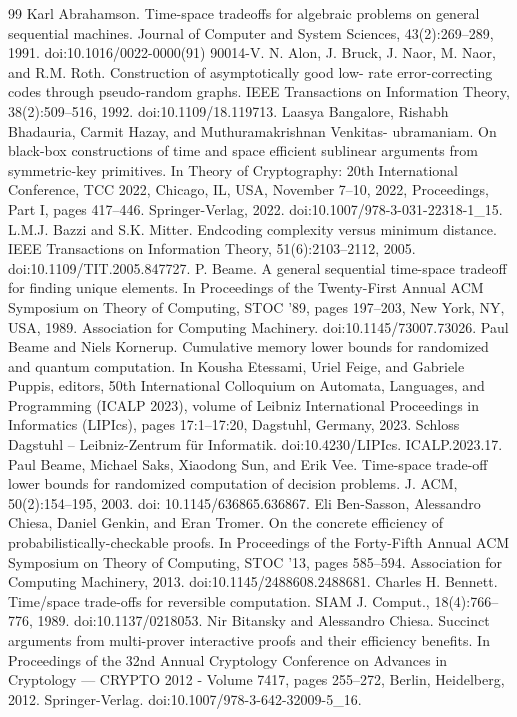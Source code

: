 \documentclass[10pt,a4paper]{article}
\begin{document}
\begin{thebibliography}{99}
 Karl Abrahamson. Time-space tradeoffs for algebraic problems on general sequential machines. Journal of Computer and System Sciences, 43(2):269–289, 1991. doi:10.1016/0022-0000(91) 90014-V.
 N. Alon, J. Bruck, J. Naor, M. Naor, and R.M. Roth. Construction of asymptotically good low- rate error-correcting codes through pseudo-random graphs. IEEE Transactions on Information Theory, 38(2):509–516, 1992. doi:10.1109/18.119713.
 Laasya Bangalore, Rishabh Bhadauria, Carmit Hazay, and Muthuramakrishnan Venkitas- ubramaniam. On black-box constructions of time and space efficient sublinear arguments from symmetric-key primitives. In Theory of Cryptography: 20th International Conference, TCC 2022, Chicago, IL, USA, November 7–10, 2022, Proceedings, Part I, pages 417–446. Springer-Verlag, 2022. doi:10.1007/978-3-031-22318-1\_15.
 L.M.J. Bazzi and S.K. Mitter. Endcoding complexity versus minimum distance. IEEE Transactions on Information Theory, 51(6):2103–2112, 2005. doi:10.1109/TIT.2005.847727.
 P. Beame. A general sequential time-space tradeoff for finding unique elements. In Proceedings of the Twenty-First Annual ACM Symposium on Theory of Computing, STOC ’89, pages 197–203, New York, NY, USA, 1989. Association for Computing Machinery. doi:10.1145/73007.73026.
 Paul Beame and Niels Kornerup. Cumulative memory lower bounds for randomized and quantum computation. In Kousha Etessami, Uriel Feige, and Gabriele Puppis, editors, 50th International Colloquium on Automata, Languages, and Programming (ICALP 2023), volume
 of Leibniz International Proceedings in Informatics (LIPIcs), pages 17:1–17:20, Dagstuhl, Germany, 2023. Schloss Dagstuhl – Leibniz-Zentrum für Informatik. doi:10.4230/LIPIcs. ICALP.2023.17.
 Paul Beame, Michael Saks, Xiaodong Sun, and Erik Vee. Time-space trade-off lower bounds for randomized computation of decision problems. J. ACM, 50(2):154–195, 2003. doi: 10.1145/636865.636867.
 Eli Ben-Sasson, Alessandro Chiesa, Daniel Genkin, and Eran Tromer. On the concrete efficiency of probabilistically-checkable proofs. In Proceedings of the Forty-Fifth Annual ACM Symposium on Theory of Computing, STOC ’13, pages 585–594. Association for Computing Machinery, 2013. doi:10.1145/2488608.2488681.
 Charles H. Bennett. Time/space trade-offs for reversible computation. SIAM J. Comput., 18(4):766–776, 1989. doi:10.1137/0218053.
 Nir Bitansky and Alessandro Chiesa. Succinct arguments from multi-prover interactive proofs and their efficiency benefits. In Proceedings of the 32nd Annual Cryptology Conference on Advances in Cryptology — CRYPTO 2012 - Volume 7417, pages 255–272, Berlin, Heidelberg, 2012. Springer-Verlag. doi:10.1007/978-3-642-32009-5\_16.

\end{thebibliography}
\end{document}
